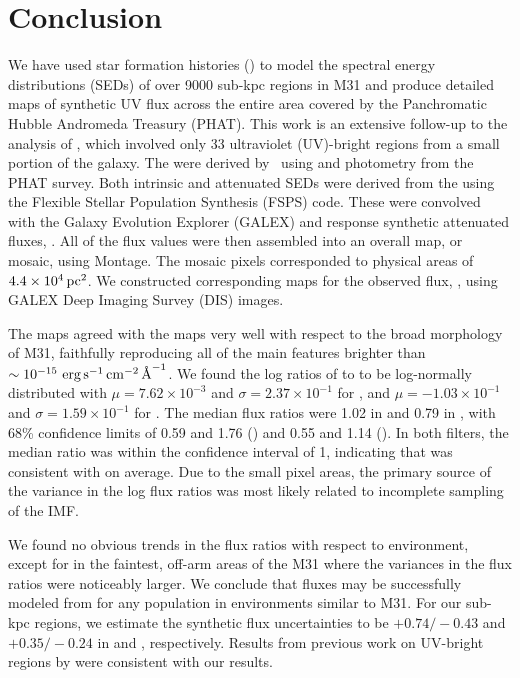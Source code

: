 \documentclass[iop, tighten]{emulateapj}
\begin{document}
\section{Conclusion}\label{conclusion}

We have used star formation histories () to model the spectral energy
distributions (SEDs) of over 9000 sub-kpc regions in M31 and produce detailed
maps of synthetic UV flux across the entire area covered by the Panchromatic
Hubble Andromeda Treasury (PHAT). This work is an extensive follow-up to the
analysis of \citet{Simones:2014}, which involved only 33 ultraviolet
(UV)-bright regions from a small portion of the galaxy. The  were
derived by \citet{Lewis:2014}\ using \acsb{} and \acsi{} photometry from the
PHAT survey. Both intrinsic and attenuated SEDs were derived from the 
using the Flexible Stellar Population Synthesis (FSPS) code. These were
convolved with the Galaxy Evolution Explorer (GALEX) \fuv{} and \nuv{} response
synthetic attenuated fluxes, \fxsfh{}. All of the flux values were then
assembled into an overall map, or mosaic, using Montage. The mosaic pixels
corresponded to physical areas of $4.4\times 10^4\,\mathrm{pc}^2$. We constructed
corresponding maps for the observed flux, \fxobs{}, using GALEX Deep Imaging
Survey (DIS) images.

The \fxsfh{} maps agreed with the \fxobs{} maps very well with respect to the
broad morphology of M31, faithfully reproducing all of the main features
brighter than $\sim 10^{-15}\, \,\mathrm{erg}\,\mathrm{s}^{-1}\,\mathrm{cm}^{-2}\,\textrm{\AA}^{-1}$. We found the log ratios of \fxsfh{} to
\fxobs{} to be log-normally distributed with $\mu = 7.62\times 10^{-3}$ and
$\sigma = 2.37\times 10^{-1}$ for \fuv{}, and $\mu = -1.03\times 10^{-1}$ and
$\sigma = 1.59\times 10^{-1}$ for \nuv{}. The median flux ratios were 1.02 in
\fuv{} and 0.79 in \nuv{}, with 68\% confidence limits of 0.59 and 1.76
(\fuv{}) and 0.55 and 1.14 (\nuv{}). In both filters, the median ratio was
within the confidence interval of 1, indicating that \fxsfh{} was consistent
with \fxobs{} on average. Due to the small pixel areas, the primary source of
the variance in the log flux ratios was most likely related to incomplete
sampling of the IMF.

We found no obvious trends in the flux ratios with respect to environment,
except for in the faintest, off-arm areas of the M31 where the variances in the
flux ratios were noticeably larger. We conclude that fluxes may be successfully
modeled from  for any population in environments similar to M31. For our
sub-kpc regions, we estimate the synthetic flux uncertainties to be
$+\!0.74/\!-\!0.43$ and $+\!0.35/\!-\!0.24$ in \fuv{} and \nuv{}, respectively.
Results from previous work on UV-bright regions by \citet{Simones:2014} were
consistent with our results.
\end{document}
